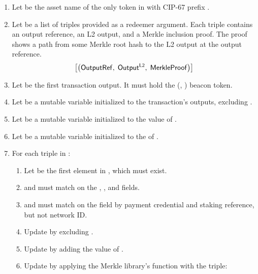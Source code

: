 \documentclass[../hydrozoa.tex]{subfiles}
\begin{document}
\begin{description}
\begin{enumerate}
      \item Let  be the asset name of the only  token in  with CIP-67 prefix \headBeaconToken{}.
      \item Let  be a list of triples provided as a redeemer argument.
          Each triple contains an output reference, an L2 output, and a Merkle inclusion proof.
          The proof shows a path from some Merkle root hash to the L2 output at the output reference.
          \begin{equation*}
            \left[\left(
              \mathsf{OutputRef},\;
              \mathsf{Output^{L2}},\;
              \mathsf{MerkleProof}
            \right)\right]
          \end{equation*}
      \item Let  be the first transaction output. It must hold the (, ) beacon token.
      \item Let  be a mutable variable initialized to the transaction's outputs, excluding .
      \item Let  be a mutable variable initialized to the value of .
      \item Let  be a mutable variable initialized to the  of .
      \item For each triple  in :
        \begin{enumerate}
          \item Let  be the first element in , which must exist.
          \item {} and  must match on the , , and  fields.
          \item {} and  must match on the  field by payment credential and staking reference, but not network ID.
          \item Update  by excluding .
          \item Update  by adding the value of .
          \item Update  by applying the Merkle library's  function with the triple:
            \begin{equation*}

\end{equation*}
\end{enumerate}
\end{enumerate}
\end{description}
\end{document}

